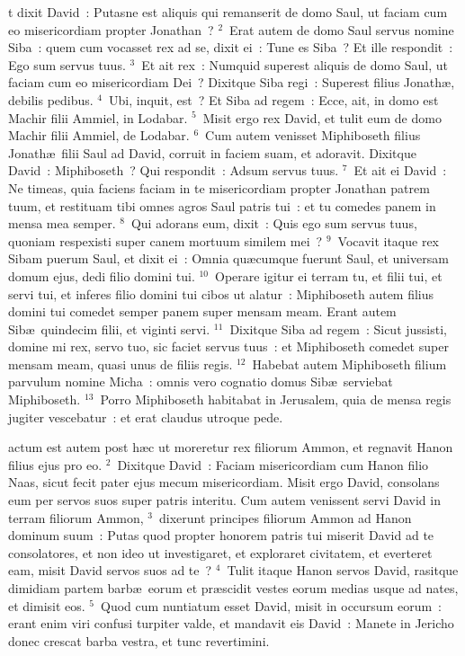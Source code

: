 \bchapter
{}t dixit David~: Putasne est aliquis qui remanserit de domo Saul, ut faciam cum eo misericordiam propter Jonathan~?
${}^{2}$~Erat autem de domo Saul servus nomine Siba~: quem cum vocasset rex ad se, dixit ei~: Tune es Siba~? Et ille respondit~: Ego sum servus tuus.
${}^{3}$~Et ait rex~: Numquid superest aliquis de domo Saul, ut faciam cum eo misericordiam Dei~? Dixitque Siba regi~: Superest filius Jonath\ae , debilis pedibus.
${}^{4}$~Ubi, inquit, est~? Et Siba ad regem~: Ecce, ait, in domo est Machir filii Ammiel, in Lodabar.
${}^{5}$~Misit ergo rex David, et tulit eum de domo Machir filii Ammiel, de Lodabar.
${}^{6}$~Cum autem venisset Miphiboseth filius Jonath\ae\ filii Saul ad David, corruit in faciem suam, et adoravit. Dixitque David~: Miphiboseth~? Qui respondit~: Adsum servus tuus.
${}^{7}$~Et ait ei David~: Ne timeas, quia faciens faciam in te misericordiam propter Jonathan patrem tuum, et restituam tibi omnes agros Saul patris tui~: et tu comedes panem in mensa mea semper.
${}^{8}$~Qui adorans eum, dixit~: Quis ego sum servus tuus, quoniam respexisti super canem mortuum similem mei~?
${}^{9}$~Vocavit itaque rex Sibam puerum Saul, et dixit ei~: Omnia qu\ae cumque fuerunt Saul, et universam domum ejus, dedi filio domini tui.
${}^{10}$~Operare igitur ei terram tu, et filii tui, et servi tui, et inferes filio domini tui cibos ut alatur~: Miphiboseth autem filius domini tui comedet semper panem super mensam meam. Erant autem Sib\ae\ quindecim filii, et viginti servi.
${}^{11}$~Dixitque Siba ad regem~: Sicut jussisti, domine mi rex, servo tuo, sic faciet servus tuus~: et Miphiboseth comedet super mensam meam, quasi unus de filiis regis.
${}^{12}$~Habebat autem Miphiboseth filium parvulum nomine Micha~: omnis vero cognatio domus Sib\ae\ serviebat Miphiboseth.
${}^{13}$~Porro Miphiboseth habitabat in Jerusalem, quia de mensa regis jugiter vescebatur~: et erat claudus utroque pede.

\bchapter
{}actum est autem post h\ae c ut moreretur rex filiorum Ammon, et regnavit Hanon filius ejus pro eo.
${}^{2}$~Dixitque David~: Faciam misericordiam cum Hanon filio Naas, sicut fecit pater ejus mecum misericordiam. Misit ergo David, consolans eum per servos suos super patris interitu. Cum autem venissent servi David in terram filiorum Ammon,
${}^{3}$~dixerunt principes filiorum Ammon ad Hanon dominum suum~: Putas quod propter honorem patris tui miserit David ad te consolatores, et non ideo ut investigaret, et exploraret civitatem, et everteret eam, misit David servos suos ad te~?
${}^{4}$~Tulit itaque Hanon servos David, rasitque dimidiam partem barb\ae\ eorum et pr\ae scidit vestes eorum medias usque ad nates, et dimisit eos.
${}^{5}$~Quod cum nuntiatum esset David, misit in occursum eorum~: erant enim viri confusi turpiter valde, et mandavit eis David~: Manete in Jericho donec crescat barba vestra, et tunc revertimini.


